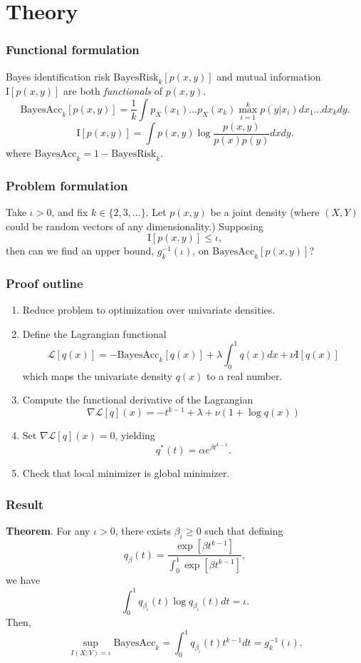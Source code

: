 \documentclass{beamer}
\begin{document}
\section{Theory}

\begin{frame}
\sectionpage
\end{frame}


\begin{frame}
\frametitle{Functional formulation}
Bayes identification risk $\text{BayesRisk}_k[p(x, y)]$ and mutual information $\text{I}[p(x, y)]$ are both \emph{functionals} of $p(x, y)$.
\[
\text{BayesAcc}_k[p(x, y)] = \frac{1}{k} \int p_X(x_1)\hdots p_X(x_k) \max_{i=1}^k p(y|x_i)  dx_1\hdots dx_k dy.
\]
\[
\text{I}[p(x, y)] = \int p(x, y) \log \frac{p(x, y)}{p(x)p(y)} dx dy.
\]
where $\text{BayesAcc}_k = 1 - \text{BayesRisk}_k$.
\end{frame}

\begin{frame}
\frametitle{Problem formulation} Take $\iota > 0$, and fix $k \in
\{2,3,...\}$.  Let $p(x, y)$ be a joint density (where $(X, Y)$
could be random vectors of any dimensionality.)  Supposing
\[
\text{I}[p(x, y)] \leq \iota,
\]
then can we find an upper bound, $g_k^{-1}(\iota)$, on $\text{BayesAcc}_k[p(x, y)]$?

\end{frame}

\begin{frame}
\frametitle{Proof outline}
\begin{enumerate}
\item Reduce problem to optimization over univariate densities.
\item Define the Lagrangian functional
\[
\mathcal{L}[q(x)] = -\text{BayesAcc}_k[q(x)] + \lambda \int_0^1 q(x) dx + \nu \text{I}[q(x)]
\]
which maps the univariate density $q(x)$ to a real number.
\item Compute the functional derivative of the Lagrangian
\[
\nabla \mathcal{L}[q](x) = -t^{k-1} + \lambda + \nu (1 + \log q(x))
\]
\item Set $\nabla \mathcal{L}[q](x) = 0$, yielding
\[
q^*(t) = \alpha e^{\beta t^{k-1}}.
\]
\item Check that local minimizer is global minimizer.
\end{enumerate}
\end{frame}

\begin{frame}
\frametitle{Result}
\textbf{Theorem}.
For any $\iota > 0$, there exists $\beta_\iota \geq 0$ such that defining
\[
q_\beta(t) = \frac{\exp[\beta t^{k-1}]}{\int_0^1 \exp[\beta t^{k-1}]},
\]
we have
\[
\int_0^1 q_{\beta_\iota}(t) \log q_{\beta_\iota}(t) dt = \iota.
\]
Then,
\[
\sup_{I(X; Y) = \iota} \text{BayesAcc}_k = \int_0^1 q_{\beta_\iota}(t) t^{k-1} dt = g_k^{-1}(\iota).
\]
\end{frame}
\end{document}
